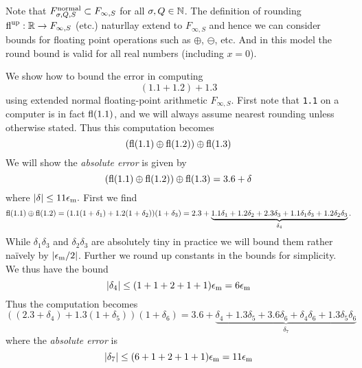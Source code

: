 Note that $F^{\rm normal}_{\ensuremath{\sigma},Q,S} \ensuremath{\subset} F_{\ensuremath{\infty},S}$ for all $\sigma,Q \in {\mathbb N}$. The definition of rounding ${\rm fl}^{\rm up} : {\mathbb R} \rightarrow F_{\infty,S}$ (etc.) naturllay extend to $F_{\ensuremath{\infty},S}$ and hence we can consider bounds for floating point operations such as $\ensuremath{\oplus}$, $\ensuremath{\ominus}$, etc. And in this model the round bound is valid for all real numbers (including $x = 0$).

\begin{example} We show how to bound the error in computing
\[
(1.1 + 1.2) + 1.3
\]
using extended normal floating-point arithmetic $F_{\ensuremath{\infty},S}$. First note that \texttt{1.1} on a computer is in fact ${\rm fl}(1.1)$, and we will always assume nearest rounding unless otherwise stated. Thus this computation becomes
\[
({\rm fl}(1.1) \ensuremath{\oplus} {\rm fl}(1.2)) \ensuremath{\oplus} {\rm fl}(1.3)
\]
We will show the \emph{absolute error} is given by
\[
({\rm fl}(1.1) \ensuremath{\oplus} {\rm fl}(1.2)) \ensuremath{\oplus} {\rm fl}(1.3) = 3.6 + \ensuremath{\delta}
\]
where $|\ensuremath{\delta}| \ensuremath{\leq}  11 \ensuremath{\epsilon}_{\rm m}.$ First we find
\[
{\rm fl}(1.1) \ensuremath{\oplus} {\rm fl}(1.2) = (1.1(1 + \ensuremath{\delta}_1) + 1.2 (1+\ensuremath{\delta}_2))(1 + \ensuremath{\delta}_3)
 = 2.3 + \underbrace{1.1 \ensuremath{\delta}_1 + 1.2 \ensuremath{\delta}_2 + 2.3 \ensuremath{\delta}_3 + 1.1 \ensuremath{\delta}_1 \ensuremath{\delta}_3 + 1.2 \ensuremath{\delta}_2 \ensuremath{\delta}_3}_{\ensuremath{\delta}_4}.
\]
While $\ensuremath{\delta}_1 \ensuremath{\delta}_3$ and $\ensuremath{\delta}_2 \ensuremath{\delta}_3$ are absolutely tiny in practice we will bound them rather naïvely by $|\ensuremath{\epsilon}_{\rm m}/2|$. Further we round up constants in the bounds for simplicity. We thus have the bound
\[
|\ensuremath{\delta}_4| \ensuremath{\leq} (1+1+2+1+1) \ensuremath{\epsilon}_{\rm m} = 6\ensuremath{\epsilon}_{\rm m}
\]
Thus the computation becomes
\[
((2.3 + \ensuremath{\delta}_4) + 1.3 (1 + \ensuremath{\delta}_5)) (1 + \ensuremath{\delta}_6) = 3.6 + \underbrace{\ensuremath{\delta}_4 + 1.3 \ensuremath{\delta}_5 + 3.6 \ensuremath{\delta}_6 + \ensuremath{\delta}_4 \ensuremath{\delta}_6  + 1.3 \ensuremath{\delta}_5 \ensuremath{\delta}_6}_{\ensuremath{\delta}_7}
\]
where the \emph{absolute error} is
\[
|\ensuremath{\delta}_7| \ensuremath{\leq} (6 + 1 + 2 + 1 + 1) \ensuremath{\epsilon}_{\rm m} = 11 \ensuremath{\epsilon}_{\rm m}
\]
\end{example}


